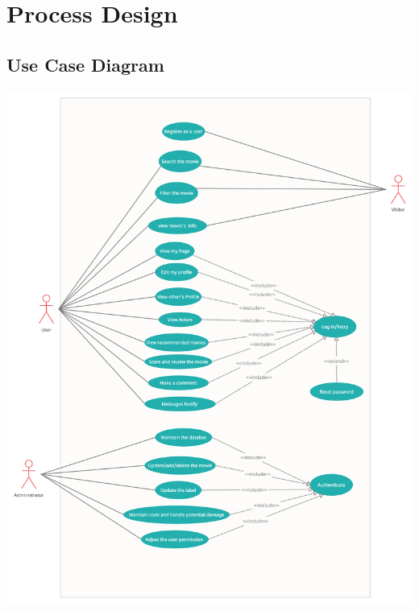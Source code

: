 \documentclass[12pt]{article}
\begin{document}
\section{Process Design}
\subsection{Use Case Diagram}
\includegraphics[width=1\linewidth]{UCD.png}\\\newpage
\end{document}
